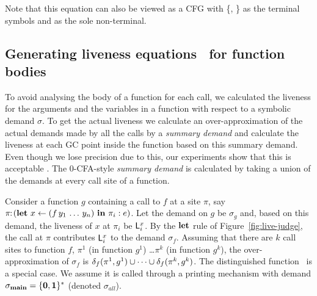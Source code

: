 \documentclass[9pt]{sigplanconf}
\newcommand{\comment}[1]{{\color{Myblue}{(#1)}}}
\begin{document}
Note that this equation can also be viewed as a CFG with \{\acdr,
\cbar\} as the terminal symbols and  as the sole
non-terminal.

\subsection{Generating liveness equations \Lv\  for function bodies}
\label{sec:bodylivenessbodies}

To avoid analysing the body of a function for each call, we calculated
the liveness  for the arguments and  the variables in  a function with
respect to a symbolic demand  $\sigma$.  To get the actual liveness we
calculate an over-approximation of the  actual demands made by all the
calls by a {\em summary demand} and calculate the liveness at each GC
point inside the  function based on this summary  demand.  Even though
we  lose precision  due to  this, our  experiments show  that  this is
acceptable  \comment{Is  this  claim  true?}.   The  0-CFA-style  {\em
  summary demand}  is calculated by taking  a union of  the demands at
every call site of a function.

Consider a function $g$ containing a  call to $f$ at a site $\pi$, say
$\pi\!\!:\!(\mbox{$\mathbf{ let}$}~x   \leftarrow   (f\,y_1\,\ldots\,y_n)~\mbox{$\mathbf{ in}$}~\pi_i:e)$.
Let the  demand on $g$  be $\sigma_g$ and,  based on this  demand, the
liveness of  $x$ at $\pi_i$ be  $\mathsf{L}_{{i}}^{x}$.  By the  $\mbox{$\mathbf{ let}$}$ rule of
Figure~\ref{fig:live-judge},    the   call   at    $\pi$   contributes
$\mathsf{L}_{{i}}^{x}$ to  the demand $\sigma_f$.  Assuming that  there are $k$
call sites to function $f$, $\pi^1$ (in function $g^1$) \ldots $\pi^k$
(in   function  $g^k$),  the   over-approximation  of   $\sigma_f$  is
$\delta_{f}({\pi^1},{g^1}) \cup \cdots \cup \delta_{f}({\pi^k},{g^k})$.
The distinguished function  \mainpgm\ is a special case.  We assume it
is called through a  printing mechanism with demand $\sigma_{\mathbf{main}} =
\{\mathbf{0},\mathbf{1}\}^\ast$ (denoted $\sigma_{\!all}$).
\end{document}
